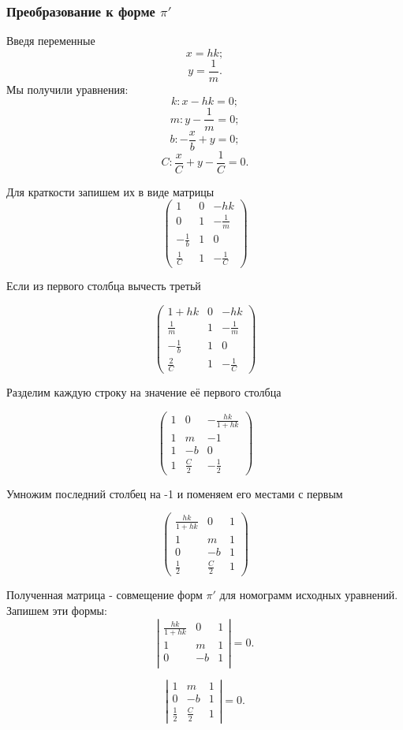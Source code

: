 \subsubsection{Преобразование к форме $\pi'$}

Введя переменные 
$$x = hk;$$
$$y = \frac{1}{m}.$$
Мы получили уравнения: 
$$k: x - hk = 0;$$
$$m: y - \frac{1}{m} = 0;$$
$$b: -\frac{x}{b} + y = 0;$$
$$C: \frac{x}{C} + y - \frac{1}{C} =0.$$

Для краткости запишем их в виде матрицы
$$
\left(
\begin{array}{ccc}
	1 & 0 & -hk \\
	0 & 1 & -\frac{1}{m} \\
	-\frac{1}{b} & 1 & 0 \\
	\frac{1}{C} & 1 & -\frac{1}{C}
\end{array}
\right)
$$

Если из первого столбца вычесть третьй

$$
\left(
\begin{array}{ccc}
	1+hk & 0 & -hk \\
	\frac{1}{m} & 1 & -\frac{1}{m} \\
	-\frac{1}{b} & 1 & 0 \\
	\frac{2}{C} & 1 & -\frac{1}{C}
\end{array}
\right)
$$

Разделим каждую строку на значение её первого столбца

$$
\left(
\begin{array}{ccc}
	1 & 0 & -\frac{hk}{1+hk} \\
	1 & m & -1 \\
	1 & -b & 0 \\
	1 & \frac{C}{2} & -\frac{1}{2}
\end{array}
\right)
$$

Умножим последний столбец на -1 и поменяем его местами с первым

$$
\left(
\begin{array}{ccc}
	\frac{hk}{1+hk} & 0 & 1 \\
	1 & m & 1 \\
	0 & -b & 1 \\
	\frac{1}{2} & \frac{C}{2} & 1
\end{array}
\right)
$$

Полученная матрица - совмещение форм $\pi'$ для номограмм исходных уравнений.
Запишем эти формы:
$$
\left|
\begin{array}{ccc}
	\frac{hk}{1+hk} & 0 & 1 \\
	1 & m & 1 \\
	0 & -b & 1 \\
\end{array}
\right| = 0.
$$

$$
\left|
\begin{array}{ccc}
	1 & m & 1 \\
	0 & -b & 1 \\
	\frac{1}{2} & \frac{C}{2} & 1
\end{array}
\right| = 0.
$$